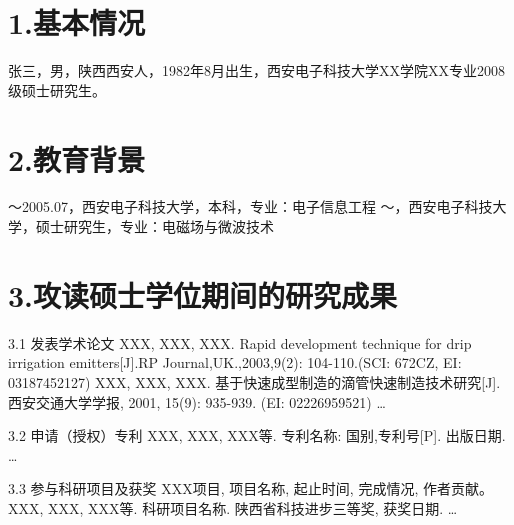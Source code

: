 
\begin{resume}

\section*{1.\hspace{0.75em}基本情况}
张三，男，陕西西安人，1982年8月出生，西安电子科技大学XX学院XX专业2008级硕士研究生。
\section*{2.\hspace{0.75em}教育背景}
\begin{resumelist*}
～2005.07，西安电子科技大学，本科，专业：电子信息工程
～\hspace{3.5em}，西安电子科技大学，硕士研究生，专业：电磁场与微波技术
\end{resumelist*}

\section*{3.\hspace{0.75em}攻读硕士学位期间的研究成果}
\begin{resumelist}{\hspace{-0.25em}3.1\hspace{0.5em} 发表学术论文}
\resumelistitem XXX, XXX, XXX. Rapid development technique for drip irrigation emitters[J].RP Journal,UK.,2003,9(2): 104-110.(SCI: 672CZ, EI: 03187452127)
\resumelistitem XXX, XXX, XXX. 基于快速成型制造的滴管快速制造技术研究[J]. 西安交通大学学报, 2001, 15(9): 935-939. (EI: 02226959521)
\resumelistitem \ldots
\end{resumelist}

\begin{resumelist}{\hspace{-0.25em}3.2\hspace{0.5em} 申请（授权）专利}
\resumelistitem XXX, XXX, XXX等. 专利名称: 国别,专利号[P]. 出版日期.
\resumelistitem \ldots
\end{resumelist}

\begin{resumelist}{\hspace{-0.25em}3.3\hspace{0.5em} 参与科研项目及获奖}
\resumelistitem XXX项目, 项目名称, 起止时间, 完成情况, 作者贡献。
\resumelistitem XXX, XXX, XXX等. 科研项目名称. 陕西省科技进步三等奖, 获奖日期.
\resumelistitem \ldots
\end{resumelist}
\end{resume}
